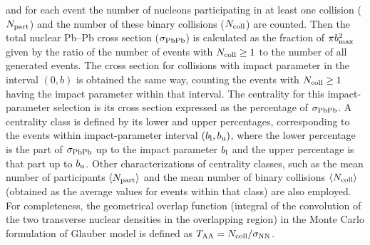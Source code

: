 and for each event the number of nucleons participating in at least one collision ($N_{\rm part}$) and the number of these binary collisions ($N_{\rm coll}$) are counted. Then the total nuclear Pb--Pb cross section ($\sigma_{\rm PbPb}$) is calculated as the fraction of $\pi b_{\rm max}^2$ given by the ratio of the number of events with $N_{\rm coll} \geq 1$ to the number of all generated events. The cross section for collisions with impact parameter in the interval $(0, b)$ is obtained the same way, counting the events with $N_{\rm coll} \geq 1$ having the impact parameter within that interval. The centrality for this impact-parameter selection is its cross section expressed as the percentage of $\sigma_{\rm PbPb}$. A centrality class is defined by its lower and upper percentages, corresponding to the events within impact-parameter interval $(b_{\rm l}, b_{\rm u})$, where the lower percentage is the part of $\sigma_{\rm PbPb}$ up to the impact parameter $b_{\rm l}$ and the upper percentage is that part up to $b_{\rm u}$. Other characterizations of centrality classes, such as the mean number of participants $\langle N_{\rm part} \rangle$ and the mean number of binary collisions $\langle N_{\rm coll} \rangle$ (obtained as the average values for events within that class) are also employed. For completeness, the geometrical overlap function (integral of the convolution  of the two transverse nuclear densities in the overlapping region) in the Monte Carlo formulation of Glauber model is defined as $T_{\rm AA} = N_{\rm coll} / \sigma_{\rm NN}$.

